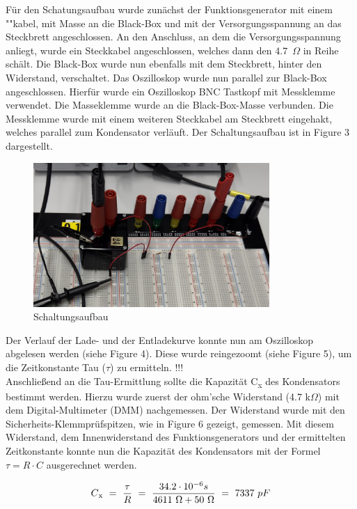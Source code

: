 \documentclass[a4paper,12pt]{article}
\begin{document}
\noindent Für den Schatungsaufbau wurde zunächst der Funktionsgenerator mit einem ""kabel, mit Masse an die Black-Box und mit der Versorgungsspannung an das Steckbrett angeschlossen. An den Anschluss, an dem die Versorgungsspannung anliegt, wurde ein Steckkabel angeschlossen, welches dann den 4.7~$\Omega$ in Reihe schält. Die Black-Box wurde nun ebenfalls mit dem Steckbrett, hinter den Widerstand, verschaltet. Das Oszilloskop wurde nun parallel zur Black-Box angeschlossen. Hierfür wurde ein Oszilloskop BNC Tastkopf mit Messklemme verwendet. Die Masseklemme wurde an die Black-Box-Masse verbunden. Die Messklemme wurde mit einem weiteren Steckkabel am Steckbrett eingehakt, welches parallel zum Kondensator verläuft. Der Schaltungsaufbau ist in Figure 3 dargestellt.

\begin{figure}[H]
    \centering
    \includegraphics[width=0.8\textwidth]{../Quellen/Labor2/IMG_3965 - Kopie.jpeg}
\caption{Schaltungsaufbau}
\end{figure}

\noindent Der Verlauf der Lade- und der Entladekurve konnte nun am Oszilloskop abgelesen werden (siehe Figure 4). Diese wurde reingezoomt (siehe Figure 5), um die Zeitkonstante Tau ($\tau$) zu ermitteln. !!! \\
Anschließend an die Tau-Ermittlung sollte die Kapazität C\textsubscript{x} des Kondensators bestimmt werden. Hierzu wurde zuerst der ohm'sche Widerstand (4.7 k$\Omega$) mit dem Digital-Multimeter (DMM) nachgemessen. Der Widerstand wurde mit den Sicherheits-Klemmprüfspitzen, wie in Figure 6 gezeigt, gemessen. Mit diesem Widerstand, dem Innenwiderstand des Funktionsgenerators und der ermittelten Zeitkonstante konnte nun die Kapazität des Kondensators mit der Formel $\tau = R \cdot C$ ausgerechnet werden.

\[
C\textsubscript{x} ~=~ \frac{\tau}{R} ~=~ \frac{34.2 \cdot 10^{-6}s}{4611~\Omega + 50~\Omega} ~=~ 7337~pF
\]
\end{document}
